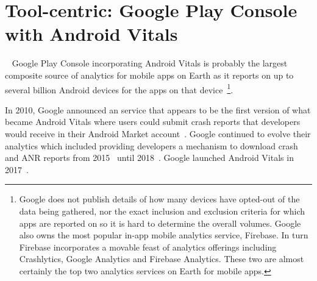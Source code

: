 
\section{Tool-centric: Google Play Console with Android Vitals}~\label{case-study-overview-google-play-console-with-android-vitals}
Google Play Console incorporating Android Vitals is probably the largest composite source of analytics for mobile apps on Earth as it reports on up to several billion Android devices for the apps on that device~\footnote{Google does not publish details of how many devices have opted-out of the data being gathered, nor the exact inclusion and exclusion criteria for which apps are reported on so it is hard to determine the overall volumes. Google also owns the most popular in-app mobile analytics service, Firebase. In turn Firebase incorporates a movable feast of analytics offerings including Crashlytics, Google Analytics and Firebase Analytics. These two are almost certainly the top two analytics services on Earth for mobile apps.}.

In 2010, Google announced an service that appears to be the first version of what became Android Vitals where users could submit crash reports that developers would receive in their Android Market account~\citep{androiddevelopersblog2010_android_error_crash_reports}. Google continued to evolve their analytics which included providing developers a mechanism to download crash and ANR reports from 2015~\citep{androiddevelopers2015_integrate_play_data_into_your_workflow_with_data_exports} until 2018~\citep{google_play_download_and_export_monthly_reports}. Google launched Android Vitals in 2017~\citep{androiddevelopersblog2017_android_vitals_increase_engagement_etc}.

